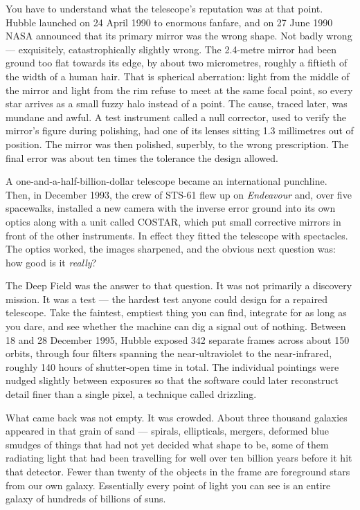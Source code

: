You have to understand what the telescope's reputation was at that point. Hubble
launched on 24 April 1990 to enormous fanfare, and on 27 June 1990 NASA announced that
its primary mirror was the wrong shape. Not badly wrong --- exquisitely, catastrophically
slightly wrong. The 2.4-metre mirror had been ground too flat towards its edge, by about
two micrometres, roughly a fiftieth of the width of a human hair. That is
spherical aberration: light from the middle of the mirror and light from the rim refuse
to meet at the same focal point, so every star arrives as a small fuzzy halo instead of a
point. The cause, traced later, was mundane and awful. A test instrument called a null
corrector, used to verify the mirror's figure during polishing, had one of its lenses
sitting 1.3 millimetres out of position. The mirror was then polished, superbly, to the
wrong prescription. The final error was about ten times the tolerance the design allowed.

A one-and-a-half-billion-dollar telescope became an international punchline. Then, in
December 1993, the crew of STS-61 flew up on \emph{Endeavour} and, over five spacewalks,
installed a new camera with the inverse error ground into its own optics along with a
unit called COSTAR, which put small corrective mirrors in front of the other
instruments. In effect they fitted the telescope with spectacles. The optics worked, the
images sharpened, and the obvious next question was: how good is it \emph{really}?

The Deep Field was the answer to that question. It was not primarily a discovery mission.
It was a test --- the hardest test anyone could design for a repaired telescope. Take the
faintest, emptiest thing you can find, integrate for as long as you dare, and see whether
the machine can dig a signal out of nothing. Between 18 and 28 December 1995, Hubble
exposed 342 separate frames across about 150 orbits, through four filters spanning the
near-ultraviolet to the near-infrared, roughly 140 hours of shutter-open time in total.
The individual pointings were nudged slightly between exposures so that the software
could later reconstruct detail finer than a single pixel, a technique called drizzling.

What came back was not empty. It was crowded. About three thousand galaxies appeared in
that grain of sand --- spirals, ellipticals, mergers, deformed blue smudges of things
that had not yet decided what shape to be, some of them radiating light that had been
travelling for well over ten billion years before it hit that detector. Fewer than twenty
of the objects in the frame are foreground stars from our own galaxy. Essentially every
point of light you can see is an entire galaxy of hundreds of billions of suns.

